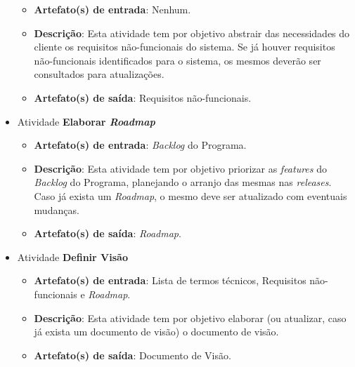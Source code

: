 \begin{itemize}
	  \begin{itemize}
	    \item \textbf{Artefato(s) de entrada}: Nenhum.
	    
	    \item \textbf{Descrição}: Esta atividade tem por objetivo abstrair das necessidades do cliente os
	      requisitos não-funcionais do sistema. Se já houver requisitos não-funcionais identificados para o sistema,
	      os mesmos deverão ser consultados para atualizações.
	    
	    \item \textbf{Artefato(s) de saída}: Requisitos não-funcionais.
		  
	  \end{itemize}
	  
     \item Atividade \textbf{Elaborar \textit{Roadmap}}
      
	  \begin{itemize}
	    \item \textbf{Artefato(s) de entrada}: \textit{Backlog} do Programa.
	    
	    \item \textbf{Descrição}: Esta atividade tem por objetivo priorizar as \textit{features} do
	      \textit{Backlog} do Programa, planejando o arranjo das mesmas nas \textit{releases}.  Caso já exista
	      um \textit{Roadmap}, o mesmo deve ser atualizado com eventuais mudanças.
	    
	    \item \textbf{Artefato(s) de saída}: \textit{Roadmap}.
		  
	  \end{itemize}
	  
     \item Atividade \textbf{Definir Visão}
      
	  \begin{itemize}
	    \item \textbf{Artefato(s) de entrada}: Lista de termos técnicos, Requisitos não-funcionais e \textit{Roadmap}.
	    
	    \item \textbf{Descrição}: Esta atividade tem por objetivo elaborar (ou atualizar, caso já exista um
	      documento de visão) o documento de visão.
	    
	    \item \textbf{Artefato(s) de saída}: Documento de Visão.
		  
	  \end{itemize}
	  

\end{itemize}
